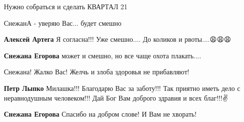 \begin{itemize}
Нужно собраться и сделать КВАРТАЛ 21

СнежанА - уверяю Вас... будет смешно

\begin{itemize}
 
\textbf{Алексей Артега} Я согласна!!!
Уже смешно....
До коликов и рвоты....😩😩😩

 
\textbf{Снежана Егорова} может и смешно, но все чаще охота плакать....

\end{itemize}

 
Снежана! Жалко Вас!
Желчь и злоба здоровья не прибавляют!

\begin{itemize}
 
\textbf{Петр Лыпко} Милашка!!!
Благодарю Вас за заботу!!!
Так приятно иметь дело с неравнодушным человеком!!!
Дай Бог Вам доброго здравия и всех благ!!!✌️

 
\textbf{Снежана Егорова}
Спасибо на добром слове! И Вам не хворать!\Laughey[1.0][white]

 

\end{itemize}
\end{itemize}
